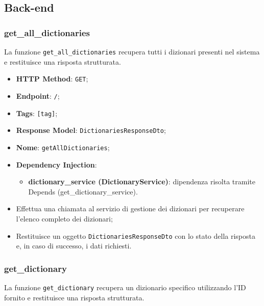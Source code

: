 \subsection{Back-end}


\subsubsection{get\_all\_dictionaries}

\par La funzione \texttt{get\_all\_dictionaries} recupera tutti i dizionari presenti nel sistema e restituisce una risposta strutturata.

\begin{itemize}
  \item \textbf{HTTP Method}: \texttt{GET};
  \item \textbf{Endpoint}: \texttt{/};
  \item \textbf{Tags}: \texttt{[tag]};
  \item \textbf{Response Model}: \texttt{DictionariesResponseDto};
  \item \textbf{Nome}: \texttt{getAllDictionaries};
  \item \textbf{Dependency Injection}:
  \begin{itemize}
    \item \textbf{dictionary\_service (DictionaryService)}: dipendenza risolta tramite Depends (get\_dictionary\_service).
  \end{itemize}
\end{itemize}

\begin{itemize}
  \item Effettua una chiamata al servizio di gestione dei dizionari per recuperare l'elenco completo dei dizionari;
  \item Restituisce un oggetto \texttt{DictionariesResponseDto} con lo stato della risposta e, in caso di successo, i dati richiesti.
\end{itemize}

\subsubsection{get\_dictionary}

\par La funzione \texttt{get\_dictionary} recupera un dizionario specifico utilizzando l'ID fornito e restituisce una risposta strutturata.

